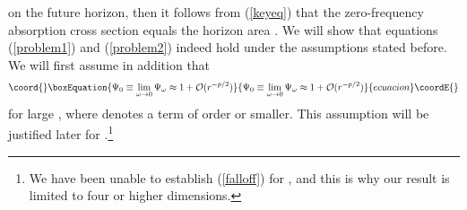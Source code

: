 \documentclass[a4paper,12pt]{article}
\begin{document}
on the future horizon,
then it follows from (\ref{keyeq}) that
the zero-frequency absorption cross section \coordHE{} equals the horizon area
\coordHE{}. 
We will show that equations (\ref{problem1}) and
(\ref{problem2}) indeed hold under the assumptions stated before.
We will first assume in addition that 
\begin{equation}\coord{}\boxEquation{
\Psi_0 \equiv \lim_{\omega \to 0}\Psi_\omega \approx 1 + {\cal O}(r^{-p/2})
\label{falloff}
}{
\Psi_0 \equiv \lim_{\omega \to 0}\Psi_\omega \approx 1 + {\cal O}(r^{-p/2})
}{ecuacion}\coordE{}\end{equation}
for large \coordHE{}, where \coordHE{} denotes a term of order
\coordHE{} or smaller.
This assumption will be justified later for \coordHE{}.\footnote{
We have been unable
to establish (\ref{falloff}) for \coordHE{}, 
and this is why our result is limited to
four or higher dimensions.}
\end{document}
